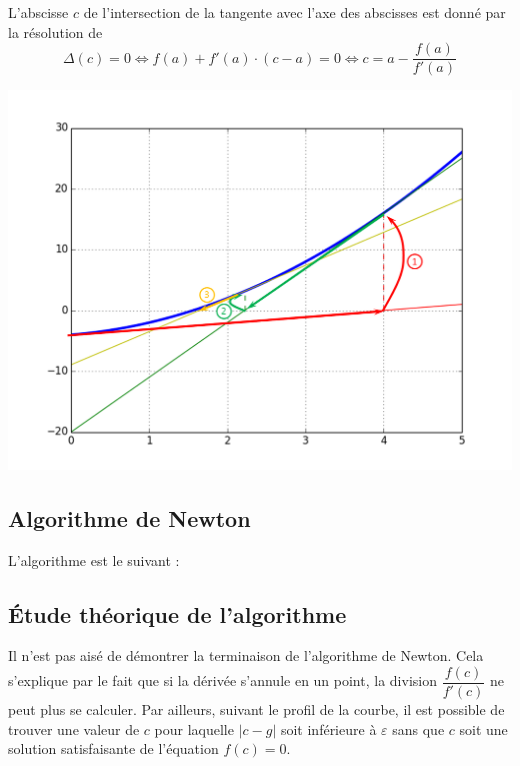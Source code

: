 \documentclass[10pt]{article}
\begin{document}
L'abscisse $c$ de l'intersection de la tangente avec l'axe des abscisses est donné par la résolution de 
$$
\Delta(c)=0 
\Longleftrightarrow f(a)+ f'(a)\cdot(c-a) = 0
\Longleftrightarrow c = a-\dfrac{f(a)}{f'(a)}
$$

\begin{center}
\includegraphics[width=.7\textwidth]{images/interpretation_newton}
\end{center}
 
\subsection{Algorithme de Newton}

L'algorithme est le suivant :

\begin{pseudo}
\begin{algorithm}[H]
\end{algorithm}
\end{pseudo}


\subsection{Étude théorique de l'algorithme}

Il n'est pas aisé de démontrer la terminaison de l'algorithme de Newton. Cela s'explique par le fait que si la dérivée s'annule en un point, la division $\dfrac{f(c)}{f'(c)}$ ne peut plus se calculer. Par ailleurs, suivant le profil de la courbe, il est possible de trouver une valeur de $c$ pour laquelle $|c-g|$ soit inférieure à $\varepsilon$ sans que $c$ soit une solution satisfaisante de l'équation $f(c)=0$. 
\end{document}
